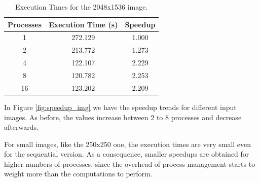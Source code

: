 \documentclass[10pt,twocolumn,letterpaper]{article}
\begin{document}
\begin{table}[H]
	\begin{center}
		\begin{tabular}{|c|c|c|}
			\hline
			Processes & Execution Time (s) & Speedup \\
			\hline
			1 & 272.129 & 1.000 \\
			2 & 213.772 & 1.273 \\
			4 & 122.107 & 2.229 \\
			8 & 120.782 & 2.253 \\
			16 & 123.202 & 2.209 \\
			\hline
		\end{tabular}
	\end{center}
	\caption{Execution Times for the 2048x1536 image.}
	\label{tab:speedup_i_4}
\end{table}

In Figure \ref{fig:speedup_img} we have the speedup trends for different input images. As before, the values increase between 2 to 8 processes and decrease afterwards.

For small images, like the 250x250 one, the execution times are very small even for the sequential version. As a consequence, smaller speedups are obtained for higher numbers of processes, since the overhead of process management starts to weight more than the computations to perform.
\end{document}
